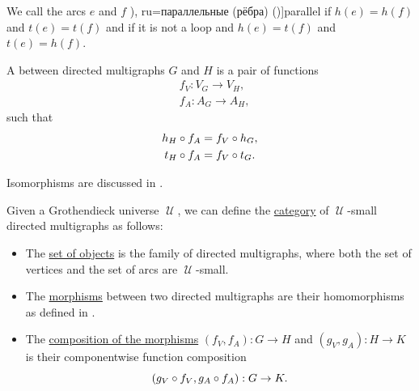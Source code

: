 \begin{definition}
\begin{thmenum}[resume=def:directed_multigraph]
    \medskip

     We call the arcs \( e \) and \( f \) \term[bg=паралелни (ребра) (\cite[7]{Мирчев2001}), ru=параллельные (рёбра) (\cite[279]{Емеличев1990})]{parallel} if \( h(e) = h(f) \) and \( t(e) = t(f) \) and  if it is not a loop and \( h(e) = t(f) \) and \( t(e) = h(f) \).

     A  between directed multigraphs \( G \) and \( H \) is a pair of functions
    \begin{align*}
      &f_V: V_G \to V_H, \\
      &f_A: A_G \to A_H,
    \end{align*}
    such that
    \begin{subequations}
      \begin{align}
        h_H \bincirc f_A &= f_V \bincirc h_G, \label{eq:def:directed_multigraph/homomorphism/head} \\
        t_H \bincirc f_A &= f_V \bincirc t_G. \label{eq:def:directed_multigraph/homomorphism/tail}
      \end{align}
    \end{subequations}

    Isomorphisms are discussed in .

     Given a Grothendieck universe \( \mscrU \), we can define the \hyperref[def:category]{category} of \( \mscrU \)-small directed multigraphs as follows:
    \begin{itemize}
      \item The \hyperref[def:category/objects]{set of objects} is the family of directed multigraphs, where both the set of vertices and the set of arcs are \( \mscrU \)-small.

      \item The \hyperref[def:category/morphisms]{morphisms} between two directed multigraphs are their homomorphisms as defined in .

      \item The \hyperref[def:category/composition]{composition of the morphisms} \( (f_V, f_A): G \to H \) and \( (g_V, g_A): H \to K \) is their componentwise function composition
      \begin{equation*}
        (g_V \bincirc f_V, g_A \bincirc f_A): G \to K.
      \end{equation*}


\end{itemize}
\end{thmenum}
\end{definition}

